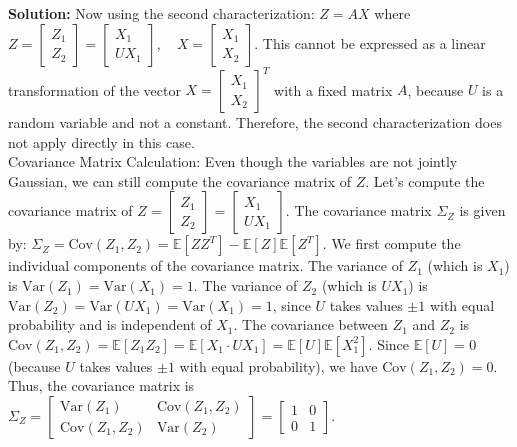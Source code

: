 \documentclass{article}
\newenvironment{solution}{\color{blue} \smallskip \textbf{Solution:}}{}
\begin{document}
\begin{enumerate}[(a)]
\begin{solution}
Now using the second characterization: \(Z = A X\) where \(Z = \begin{bmatrix} Z_1 \\ Z_2 \end{bmatrix} = \begin{bmatrix} X_1 \\ U X_1 \end{bmatrix}, \quad X = \begin{bmatrix} X_1 \\ X_2 \end{bmatrix}\). This cannot be expressed as a linear transformation of the vector \(X = \begin{bmatrix} X_1 \\ X_2 \end{bmatrix}^T\) with a fixed matrix \(A\), because \(U\) is a random variable and not a constant. Therefore, the second characterization does not apply directly in this case.\\

Covariance Matrix Calculation: Even though the variables are not jointly Gaussian, we can still compute the covariance matrix of \(Z\). Let’s compute the covariance matrix of \(Z = \begin{bmatrix} Z_1 \\ Z_2 \end{bmatrix} = \begin{bmatrix} X_1 \\ U X_1 \end{bmatrix}\). The covariance matrix \(\Sigma_Z\) is given by: \(\Sigma_Z = \text{Cov}(Z_1, Z_2) = \mathbb{E}\left[Z Z^T\right] - \mathbb{E}\left[Z\right] \mathbb{E}\left[Z^T\right]\). We first compute the individual components of the covariance matrix. The variance of \(Z_1\) (which is \(X_1\)) is \(\text{Var}(Z_1) = \text{Var}(X_1) = 1\). The variance of \(Z_2\) (which is \(U X_1\)) is \(\text{Var}(Z_2) = \text{Var}(U X_1) = \text{Var}(X_1) = 1\), since \(U\) takes values \(\pm 1\) with equal probability and is independent of \(X_1\). The covariance between \(Z_1\) and \(Z_2\) is \(\text{Cov}(Z_1, Z_2) = \mathbb{E}[Z_1 Z_2] = \mathbb{E}[X_1 \cdot U X_1] = \mathbb{E}[U] \mathbb{E}[X_1^2]\). Since \(\mathbb{E}[U] = 0\) (because \(U\) takes values \(\pm 1\) with equal probability), we have \(\text{Cov}(Z_1, Z_2) = 0\). Thus, the covariance matrix is \(\Sigma_Z = \begin{bmatrix} \text{Var}(Z_1) & \text{Cov}(Z_1, Z_2) \\ \text{Cov}(Z_1, Z_2) & \text{Var}(Z_2) \end{bmatrix} = \begin{bmatrix} 1 & 0 \\ 0 & 1 \end{bmatrix}\).




\end{solution}
\end{enumerate}
\end{document}
